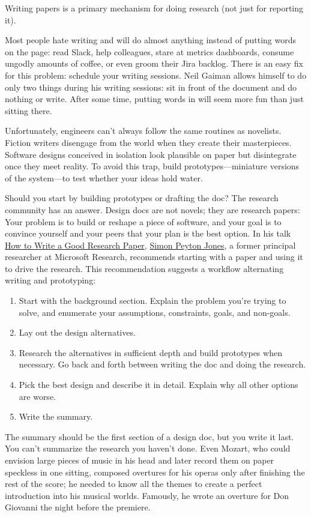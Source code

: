 \documentclass{article}
\begin{document}
\epigraph{
Writing papers is a primary mechanism for doing research (not just for reporting it).
}{}

Most people hate writing and will do almost anything instead of putting words on the page: read Slack, help colleagues, stare at metrics dashboards, consume ungodly amounts of coffee, or even groom their Jira backlog.
There is an easy fix for this problem: schedule your writing sessions.
Neil Gaiman allows himself to do only two things during his writing sessions: sit in front of the document and do nothing or write.
After some time, putting words in will seem more fun than just sitting there.

Unfortunately, engineers can't always follow the same routines as novelists.
Fiction writers disengage from the world when they create their masterpieces.
Software designs conceived in isolation look plausible on paper but disintegrate once they meet reality.
To avoid this trap, build prototypes---miniature versions of the system---to test whether your ideas hold water.

Should you start by building prototypes or drafting the doc?
The research community has an answer.
Design docs are not novels; they are research papers:
Your problem is to build or reshape a piece of software, and your goal is to convince yourself and your peers that your plan is the best option.
In his talk \href{https://youtu.be/WP-FkUaOcOM}{How to Write a Good Research Paper}, \href{https://simon.peytonjones.org/}{Simon Peyton Jones}, a former principal researcher at Microsoft Research, recommends starting with a paper and using it to drive the research.
This recommendation suggests a workflow alternating writing and prototyping:
\begin{enumerate}
\item Start with the background section.
  Explain the problem you're trying to solve, and enumerate your assumptions, constraints, goals, and non-goals.
\item Lay out the design alternatives.
\item Research the alternatives in sufficient depth and build prototypes when necessary.
  Go back and forth between writing the doc and doing the research.
\item Pick the best design and describe it in detail.
  Explain why all other options are worse.
\item Write the summary.
\end{enumerate}

The summary should be the first section of a design doc, but you write it last.
You can't summarize the research you haven't done.
Even Mozart, who could envision large pieces of music in his head and later record them on paper speckless in one sitting, composed overtures for his operas only after finishing the rest of the score; he needed to know all the themes to create a perfect introduction into his musical worlds.
Famously, he wrote an overture for Don Giovanni the night before the premiere.
\end{document}

